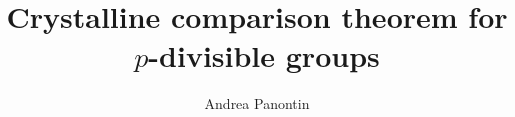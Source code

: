 \documentclass[a4paper,10pt,titlepage]{report}%
\title{Crystalline comparison theorem for $p$-divisible groups}
\author{Andrea Panontin}
\theoremstyle{example}
\theoremstyle{definition}
\numberwithin{equation}{section}
\begin{document}
%
\maketitle

\tableofcontents

\newpage

%


%

\nocite{*}
\printbibliography
\end{document}
